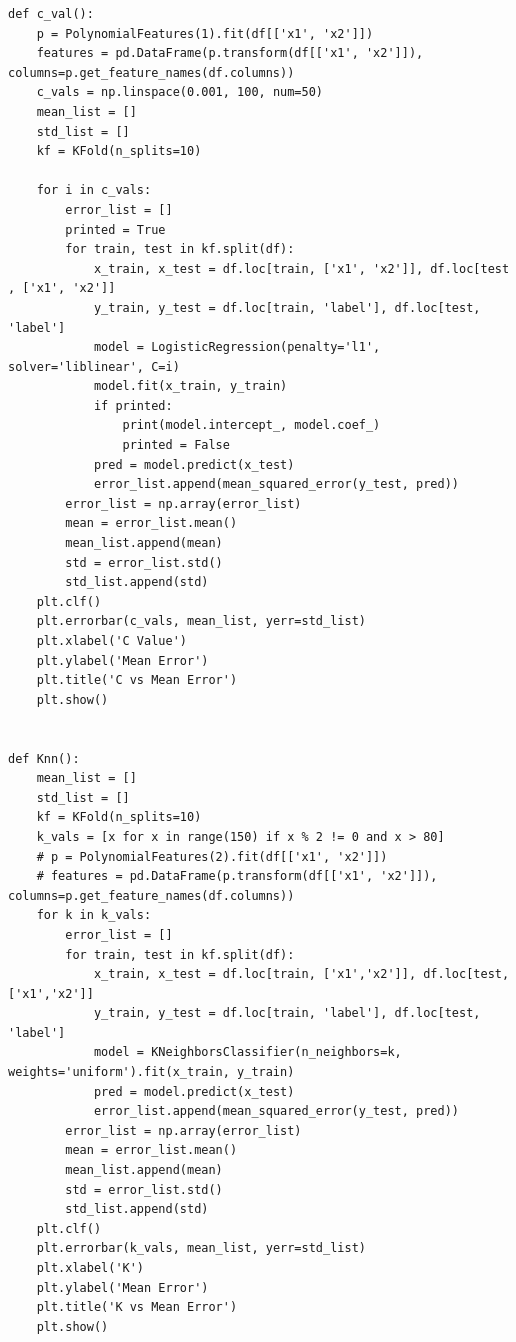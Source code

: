 \documentclass[11pt]{article} %
\begin{document}
\begin{verbatim}
def c_val():
    p = PolynomialFeatures(1).fit(df[['x1', 'x2']])
    features = pd.DataFrame(p.transform(df[['x1', 'x2']]), columns=p.get_feature_names(df.columns))
    c_vals = np.linspace(0.001, 100, num=50)
    mean_list = []
    std_list = []
    kf = KFold(n_splits=10)

    for i in c_vals:
        error_list = []
        printed = True
        for train, test in kf.split(df):
            x_train, x_test = df.loc[train, ['x1', 'x2']], df.loc[test , ['x1', 'x2']]
            y_train, y_test = df.loc[train, 'label'], df.loc[test, 'label']
            model = LogisticRegression(penalty='l1', solver='liblinear', C=i)
            model.fit(x_train, y_train)
            if printed:
                print(model.intercept_, model.coef_)
                printed = False
            pred = model.predict(x_test)
            error_list.append(mean_squared_error(y_test, pred))
        error_list = np.array(error_list)
        mean = error_list.mean()
        mean_list.append(mean)
        std = error_list.std()
        std_list.append(std)
    plt.clf()
    plt.errorbar(c_vals, mean_list, yerr=std_list)
    plt.xlabel('C Value')
    plt.ylabel('Mean Error')
    plt.title('C vs Mean Error')
    plt.show()


def Knn():
    mean_list = []
    std_list = []
    kf = KFold(n_splits=10)
    k_vals = [x for x in range(150) if x % 2 != 0 and x > 80]
    # p = PolynomialFeatures(2).fit(df[['x1', 'x2']])
    # features = pd.DataFrame(p.transform(df[['x1', 'x2']]), columns=p.get_feature_names(df.columns))
    for k in k_vals:
        error_list = []
        for train, test in kf.split(df):
            x_train, x_test = df.loc[train, ['x1','x2']], df.loc[test, ['x1','x2']]
            y_train, y_test = df.loc[train, 'label'], df.loc[test, 'label']
            model = KNeighborsClassifier(n_neighbors=k, weights='uniform').fit(x_train, y_train)
            pred = model.predict(x_test)
            error_list.append(mean_squared_error(y_test, pred))
        error_list = np.array(error_list)
        mean = error_list.mean()
        mean_list.append(mean)
        std = error_list.std()
        std_list.append(std)
    plt.clf()
    plt.errorbar(k_vals, mean_list, yerr=std_list)
    plt.xlabel('K')
    plt.ylabel('Mean Error')
    plt.title('K vs Mean Error')
    plt.show()



\end{verbatim}
\end{document}
